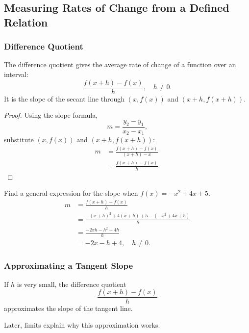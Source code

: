 \subsection{Measuring Rates of Change from a Defined Relation}

\subsubsection{Difference Quotient}
\begin{definition}
The difference quotient gives the average rate of change of a function over an interval:
\[
  \frac{f(x+h)-f(x)}{h}, \quad h\ne 0.
\]
It is the slope of the secant line through $(x,f(x))$ and $(x+h,f(x+h))$.
\end{definition}

\begin{proof}
Using the slope formula,
\[
  m=\frac{y_2-y_1}{x_2-x_1},
\]
substitute $(x,f(x))$ and $(x+h,f(x+h))$:
\begin{align*}
  m &= \frac{f(x+h)-f(x)}{(x+h)-x} \\
    &= \frac{f(x+h)-f(x)}{h}.
\end{align*}
\end{proof}

\begin{example}
Find a general expression for the slope when $f(x)=-x^2+4x+5$.
\begin{align*}
  m &= \frac{f(x+h)-f(x)}{h} \\
    &= \frac{-(x+h)^2+4(x+h)+5-(-x^2+4x+5)}{h} \\
    &= \frac{-2xh-h^2+4h}{h} \\
    &= -2x-h+4, \quad h\ne 0.
\end{align*}
\end{example}

\subsubsection{Approximating a Tangent Slope}
If $h$ is very small, the difference quotient
\[
  \frac{f(x+h)-f(x)}{h}
\]
approximates the slope of the tangent line.

Later, limits explain why this approximation works.

